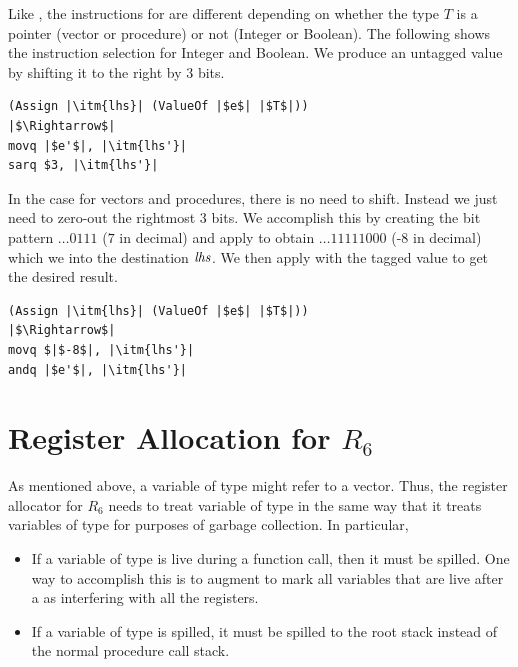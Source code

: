 \documentclass[11pt]{book}
\begin{document}
Like , the instructions for  are different
depending on whether the type $T$ is a pointer (vector or procedure)
or not (Integer or Boolean). The following shows the instruction
selection for Integer and Boolean.  We produce an untagged value by
shifting it to the right by 3 bits.
\begin{lstlisting}
(Assign |\itm{lhs}| (ValueOf |$e$| |$T$|))
|$\Rightarrow$|
movq |$e'$|, |\itm{lhs'}|
sarq $3, |\itm{lhs'}|
\end{lstlisting}
%
In the case for vectors and procedures, there is no need to
shift. Instead we just need to zero-out the rightmost 3 bits. We
accomplish this by creating the bit pattern $\ldots 0111$ ($7$ in
decimal) and apply  to obtain $\ldots 11111000$ (-8
in decimal) which we  into the destination $\mathit{lhs}$.  We
then apply  with the tagged value to get the desired
result. \\
\begin{lstlisting}
(Assign |\itm{lhs}| (ValueOf |$e$| |$T$|))
|$\Rightarrow$|
movq $|$-8$|, |\itm{lhs'}|
andq |$e'$|, |\itm{lhs'}|
\end{lstlisting}


\section{Register Allocation for $R_6$}
\label{sec:register-allocation-r6}

As mentioned above, a variable of type  might refer to a
vector. Thus, the register allocator for $R_6$ needs to treat variable
of type  in the same way that it treats variables of type
 for purposes of garbage collection. In particular,
\begin{itemize}
\item If a variable of type  is live during a function call,
  then it must be spilled. One way to accomplish this is to augment
   to mark all variables that are live after
  a  as interfering with all the registers.

\item If a variable of type  is spilled, it must be spilled
  to the root stack instead of the normal procedure call stack.
\end{itemize}
\end{document}
